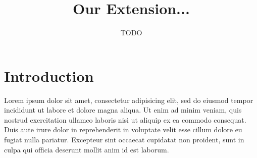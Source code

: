 \documentclass[12pt, a4paper]{article}
\begin{document}
\title{Our Extension...}
\author{TODO}

\maketitle

\section{Introduction}

Lorem ipsum dolor sit amet, consectetur adipisicing elit, sed do eiusmod tempor
incididunt ut labore et dolore magna aliqua. Ut enim ad minim veniam, quis
nostrud exercitation ullamco laboris nisi ut aliquip ex ea commodo consequat.
Duis aute irure dolor in reprehenderit in voluptate velit esse cillum dolore eu
fugiat nulla pariatur. Excepteur sint occaecat cupidatat non proident, sunt in
culpa qui officia deserunt mollit anim id est laborum.
\end{document}
